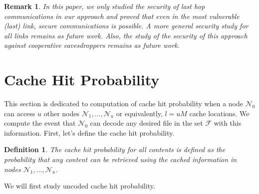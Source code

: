 \documentclass[10pt,journal]{IEEEtran}
\newtheorem{rem}{Remark}
\newtheorem{mydef}{Definition}
\begin{document}
{%

\begin{rem}{\em
 In this paper, we only studied the security of last hop communications in our approach and proved that even in the most vulnerable (last) link, secure communications is possible. A more general security study for all links remains as future work. Also, the study of the security of this approach against cooperative eavesdroppers remains as future work. 
}\label{rem_last_hop}
\end{rem}


\section{Cache Hit Probability}
\label{cache_hit}
This section is dedicated to computation of cache hit probability when a node $\mathcal{N}_0$ can access $u$ other nodes $\mathcal{N}_1,\dots,\mathcal{N}_u$ or equivalently, $l=u M$ cache locations. We compute the event that $\mathcal{N}_0$ can decode any desired file in the set $\mathcal{F}$ with this information. First, let's define the cache hit probability.  
\begin{mydef}{\em
 The \emph{cache hit probability for all contents} is defined as the probability that any content can be retrieved using the cached information in nodes $\mathcal{N}_1,\dots,\mathcal{N}_u$. 
 }\label{def_hit_all}
\end{mydef}
We will first study uncoded cache hit probability. 
}
\end{document}
